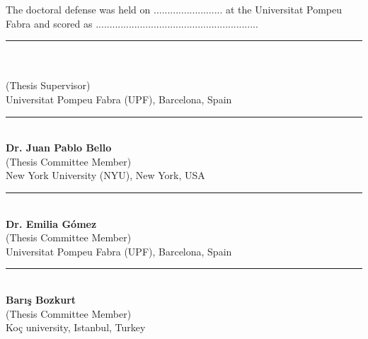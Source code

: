 
\newcommand\advisor[2]{
	\vspace{1.3cm}
	\begin{center}
		\rule{6cm}{0.8pt}\\
		\textbf{#1}\\
		(Thesis Supervisor)\\
		#2
	\end{center}
}
\newcommand\member[2]{
	\vspace{1.3cm}
	\begin{center}
		\rule{6cm}{0.8pt}\\
		\textbf{#1}\\
		(Thesis Committee Member) \\
		#2
	\end{center}
} 

\vspace{1cm}
\noindent The doctoral defense was held on ......................... at the Universitat Pompeu Fabra and scored as ...........................................................\par
\vspace{2cm}
\advisor{\supervisor}{Universitat Pompeu Fabra (UPF), Barcelona, Spain}
\vspace*{0.3cm}

\member{Dr. Juan Pablo Bello}{New York University (NYU), New York, USA}
\member{Dr. Emilia G{\'o}mez}{Universitat Pompeu Fabra (UPF), Barcelona, Spain}
\member{Barış Bozkurt}{Koç university, Istanbul, Turkey}